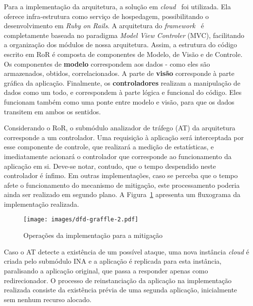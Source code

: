 Para a implementação da arquitetura, a solução em \emph{cloud}~\cite{heroku} foi utilizada. Ela oferece infra-estrutura como serviço de hospedagem, possibilitando o desenvolvimento em \emph{Ruby on Rails}. %
%
%
A arquitetura do \emph{framework}~\cite{ror} é completamente baseada no paradigma \emph{Model View Controler} (MVC), facilitando a organização dos módulos de nossa arquitetura. Assim, a estrutura do código escrito em RoR é composta de componentes de Modelo, de Visão e de Controle. Os componentes de \textbf{modelo} correspondem aos dados - como eles são armazenados, obtidos, correlacionados. A parte de \textbf{visão} corresponde à parte gráfica da aplicação. Finalmente, os \textbf{controladores} realizam a manipulação de dados como um todo, e correspondem à parte lógica e funcional do código. Eles funcionam também como uma ponte entre modelo e visão, para que os dados transitem em ambos os sentidos.
%

Considerando o RoR, o submódulo analizador de tráfego (AT) da arquitetura corresponde a um controlador. Uma requisição à aplicação será interceptada por esse componente de controle, que realizará a medição de estatísticas, e imediatamente acionará o controlador que corresponde ao funcionamento da aplicação em si. Deve-se notar, contudo, que o tempo despendido neste controlador é ínfimo. Em outras implementações, caso se perceba que o tempo afete o funcionamento do mecanismo de mitigação, este processamento poderia ainda ser realizado em segundo plano. A Figura~\ref{fig:dfd} apresenta um fluxograma da implementação realizada.

\begin{figure}[ht!]
	\centering
	\texttt{[image: images/dfd-graffle-2.pdf]}
	\caption{Operações da implementação para a mitigação}
	\label{fig:dfd}
\end{figure}

Caso o AT detecte a existência de um possível ataque, uma nova instância \emph{cloud} é criada pelo submódulo INA e a aplicação é replicada para esta instância, paralisando a aplicação original, que passa a responder apenas como redirecionador. O processo de reinstanciação da aplicação na implementação realizada consiste da existência prévia de uma segunda aplicação, inicialmente sem nenhum recurso alocado. %

